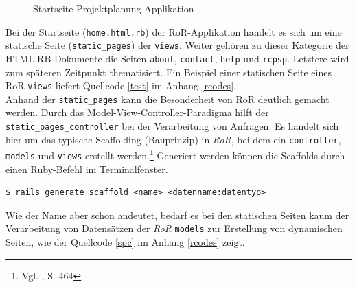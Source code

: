 \documentclass[a4paper,12pt,parskip,bibtotoc,liststotoc]{article}
\begin{document}
\begin{figure}[h!]
  \begin{center}
    \caption{Startseite Projektplanung Applikation}  \label{Start}
  \end{center}
\end{figure}

Bei der Startseite (\texttt{home.html.rb}) der RoR-Applikation handelt es sich um eine statische Seite (\texttt{static\_pages}) der \texttt{views}. Weiter gehören zu dieser Kategorie der HTML.RB-Dokumente die Seiten \texttt{about}, \texttt{contact}, \texttt{help} und \texttt{rcpsp}. Letztere wird zum späteren Zeitpunkt thematisiert. Ein Beispiel einer statischen Seite eines RoR \texttt{views} liefert Quellcode \ref{test} im Anhang \ref{rcodes}.\\

Anhand der \texttt{static\_pages} kann die Besonderheit von RoR deutlich gemacht werden. Durch das Model-View-Controller-Paradigma hilft der \texttt{static\_pages\_controller} bei der Verarbeitung von Anfragen. Es handelt sich hier um das typische Scaffolding (Bauprinzip) in \textit{RoR}, bei dem ein \texttt{controller}, \texttt{models} und \texttt{views} erstellt werden.\footnote{Vgl. \cite{walter2008ruby}, S. 464} Generiert werden können die Scaffolds durch  einen Ruby-Befehl im Terminalfenster.
\begin{lstlisting}[style=Befehl]
$ rails generate scaffold <name> <datenname:datentyp> 
\end{lstlisting}

Wie der Name aber schon andeutet, bedarf es bei den statischen Seiten kaum der Verarbeitung von Datensätzen der \textit{RoR} \texttt{models} zur Erstellung von dynamischen Seiten, wie der Quellcode \ref{spc} im Anhang \ref{rcodes} zeigt.\\
\end{document}
